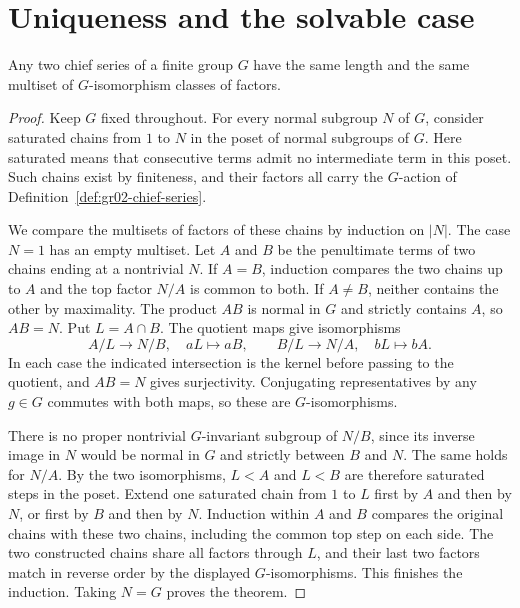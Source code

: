 \section{Uniqueness and the solvable case}

\begin{theorem}
\label{thm:gr02-chief-uniqueness}
Any two chief series of a finite group \(G\) have the same length
and the same multiset of \(G\)-isomorphism classes of factors.
\end{theorem}
\begin{proof}
Keep \(G\) fixed throughout. For every normal subgroup \(N\) of
\(G\), consider saturated chains from \(1\) to \(N\) in the poset
of normal subgroups of \(G\). Here saturated means that consecutive
terms admit no intermediate term in this poset. Such chains exist
by finiteness, and their factors all carry the \(G\)-action of
Definition~\ref{def:gr02-chief-series}.

We compare the multisets of factors of these chains by induction on
\(|N|\). The case \(N=1\) has an empty multiset. Let \(A\) and \(B\)
be the penultimate terms of two chains ending at a nontrivial
\(N\). If \(A=B\), induction compares the two chains up to \(A\)
and the top factor \(N/A\) is common to both. If \(A\ne B\), neither
contains the other by maximality. The product \(AB\) is normal in
\(G\) and strictly contains \(A\), so \(AB=N\). Put \(L=A\cap B\).
The quotient maps give isomorphisms
\[
  A/L \longrightarrow N/B,\quad aL\longmapsto aB,
  \qquad
  B/L \longrightarrow N/A,\quad bL\longmapsto bA.
\]
In each case the indicated intersection is the kernel before
passing to the quotient, and \(AB=N\) gives surjectivity.
Conjugating representatives by any \(g\in G\) commutes with both
maps, so these are \(G\)-isomorphisms.

There is no proper nontrivial \(G\)-invariant subgroup of \(N/B\),
since its inverse image in \(N\) would be normal in \(G\) and
strictly between \(B\) and \(N\). The same holds for \(N/A\).
By the two isomorphisms, \(L<A\) and \(L<B\) are therefore saturated
steps in the poset. Extend one saturated chain from \(1\) to \(L\)
first by \(A\) and then by \(N\), or first by \(B\) and then by \(N\).
Induction within \(A\) and \(B\) compares the original chains with
these two chains, including the common top step on each side.
The two constructed chains share all factors through \(L\), and
their last two factors match in reverse order by the displayed
\(G\)-isomorphisms. This finishes the induction. Taking \(N=G\)
proves the theorem.
\end{proof}

